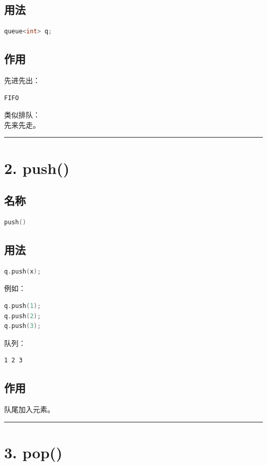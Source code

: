 \documentclass[10pt,twocolumn]{extarticle}
\begin{document}
\subsection{用法}
\begin{lstlisting}[language=C++]
queue<int> q;
\end{lstlisting}

\subsection{作用}
先进先出：
\begin{lstlisting}
FIFO
\end{lstlisting}
类似排队：\\
先来先走。

\noindent\rule{\linewidth}{0.4pt}

\section{2. push()}

\subsection{名称}
\begin{lstlisting}[language=C++]
push()
\end{lstlisting}

\subsection{用法}
\begin{lstlisting}[language=C++]
q.push(x);
\end{lstlisting}
例如：
\begin{lstlisting}[language=C++]
q.push(1);
q.push(2);
q.push(3);
\end{lstlisting}
队列：
\begin{lstlisting}
1 2 3
\end{lstlisting}

\subsection{作用}
队尾加入元素。

\noindent\rule{\linewidth}{0.4pt}

\section{3. pop()}
\end{document}
